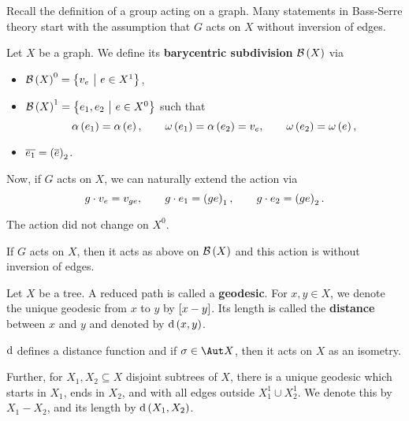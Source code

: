 Recall the definition of a group acting on a graph. Many statements in Bass-Serre theory start with the assumption that $ G $ acts on $ X $ without inversion of edges.

\begin{definition}
Let $ X $ be a graph. We define its \textbf{barycentric subdivision} $ \BBB\br{X} $ via
\begin{itemize}
\item $ \BBB\br{X}^0 = \cbr{v_e \st e \in X^1} $,
\item $ \BBB\br{X}^1 = \cbr{e_1, e_2 \st e \in X^0} $ such that
$$ \alpha\br{e_1} = \alpha\br{e}, \qquad \omega\br{e_1} = \alpha\br{e_2} = v_e, \qquad \omega\br{e_2} = \omega\br{e}, $$
\item $ \overline{e_1} = \br{\overline{e}}_2 $.
\end{itemize}
\end{definition}

Now, if $ G $ acts on $ X $, we can naturally extend the action via
$$ g \cdot v_e = v_{ge}, \qquad g \cdot e_1 = \br{ge}_1, \qquad g \cdot e_2 = \br{ge}_2. $$

\begin{note*}
The action did not change on $ X^0 $.
\end{note*}

\begin{exercise}
If $ G $ acts on $ X $, then it acts as above on $ \BBB\br{X} $ and this action is without inversion of edges.
\end{exercise}

\begin{definition}
Let $ X $ be a tree. A reduced path is called a \textbf{geodesic}. For $ x, y \in X $, we denote the unique geodesic from $ x $ to $ y $ by $ \sbr{x - y} $. Its length is called the \textbf{distance} between $ x $ and $ y $ and denoted by $ \d\br{x, y} $.
\end{definition}

\begin{note*}
$ \mathrm{d} $ defines a distance function and if $ \sigma \in \Aut X $, then it acts on $ X $ as an isometry.
\end{note*}

\begin{note*}
Further, for $ X_1, X_2 \subseteq X $ disjoint subtrees of $ X $, there is a unique geodesic which starts in $ X_1 $, ends in $ X_2 $, and with all edges outside $ X_1^1 \cup X_2^1 $. We denote this by $ X_1 - X_2 $, and its length by $ \d\br{X_1, X_2} $.
\end{note*}

